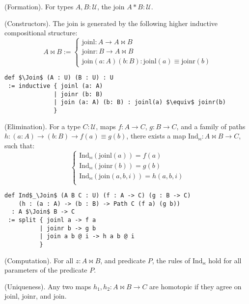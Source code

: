 \documentclass{article}
\begin{document}
\begin{definition} (Formation).
For types \( A, B : \mathcal{U} \), the join \( A * B : \mathcal{U} \).
\end{definition}

\begin{definition} (Constructors).
The join is generated by the following higher inductive compositional structure:
\[
A \Join B :=
\begin{cases}
\text{joinl} : A \to A \Join B \\
\text{joinr} : B \to A \Join B \\
\text{join} (a : A) (b : B) : \text{joinl}(a) \equiv \text{joinr}(b)
\end{cases}
\]
\begin{lstlisting}[mathescape=true]
def $\Join$ (A : U) (B : U) : U
 := inductive { joinl (a: A)
              | joinr (b: B)
              | join (a: A) (b: B) : joinl(a) $\equiv$ joinr(b)
              }
\end{lstlisting}
\end{definition}

\begin{theorem} (Elimination).
For a type \( C : \mathcal{U} \), maps \( f : A \to C \), \( g : B \to C \),
and a family of paths \( h : (a : A) \to (b : B) \to f(a) \equiv g(b) \),
there exists a map \( \text{Ind}_\Join : A \Join B \to C \), such that:
\[
\begin{cases}
\text{Ind}_\Join(\text{joinl}(a)) = f(a) \\
\text{Ind}_\Join(\text{joinr}(b)) = g(b) \\
\text{Ind}_\Join(\text{join}(a,b,i)) = h(a,b,i) \\
\end{cases}
\]
\begin{lstlisting}[mathescape=true]
def Ind$_\Join$ (A B C : U) (f : A -> C) (g : B -> C)
    (h : (a : A) -> (b : B) -> Path C (f a) (g b))
  : A $\Join$ B -> C
 := split { joinl a -> f a
          | joinr b -> g b
          | join a b @ i -> h a b @ i
          }
\end{lstlisting}
\end{theorem}

\begin{theorem} (Computation).
For all \( z : A \Join B \), and predicate \( P \), the rules of \( \text{Ind}_\Join \) hold for all parameters of the predicate \( P \).
\end{theorem}

\begin{theorem} (Uniqueness).
Any two maps \( h_1, h_2 : A \Join B \to C \) are homotopic
if they agree on \( \text{joinl} \), \( \text{joinr} \), and \( \text{join} \).
\end{theorem}
\end{document}

